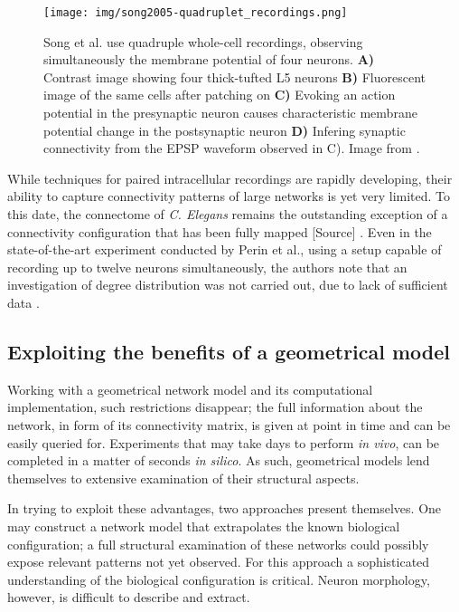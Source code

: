 \vspace{0.35cm}
\begin{figure}[bth]
  \centering
  \texttt{[image: img/song2005-quadruplet\_recordings.png]}
  \caption{Song et al. use quadruple whole-cell recordings, observing
    simultaneously the membrane potential of four neurons.
    \textbf{A)} Contrast image showing four thick-tufted L5 neurons
    \textbf{B)} Fluorescent image of the same cells after patching on
    \textbf{C)} Evoking an action potential in the presynaptic neuron
    causes characteristic membrane potential change in the
    postsynaptic neuron \textbf{D)} Infering synaptic connectivity
    from the EPSP waveform observed in C). Image from \parencite{Song2005}.
  }
\end{figure}
\vspace{0.45cm}

While techniques for paired intracellular recordings are rapidly
developing, their ability to capture connectivity patterns of large
networks is yet very limited. To this date, the connectome of
\textit{C. Elegans} remains the outstanding exception of a
connectivity configuration that has been fully mapped
[\textcolor{linkgrey}{Source}]%
. Even in the state-of-the-art experiment conducted by Perin et al.,
using a setup capable of recording up to twelve neurons
simultaneously, the authors note that an investigation of degree
distribution was not carried out, due to lack of sufficient data
\parencite{Perin2011}.

\subsection*{Exploiting the benefits of a geometrical model}

Working with a geometrical network model and its computational
implementation, such restrictions disappear; the full information
about the network, in form of its connectivity matrix, is given at
point in time and can be easily queried for. Experiments that may take
days to perform \textit{in vivo}, can be completed in a matter of seconds \textit{in
silico}. As such, geometrical models lend themselves to extensive
examination of their structural aspects.

In trying to exploit these advantages, two approaches present
themselves. One may construct a network model that
extrapolates the known
biological configuration; a full structural examination of these
networks could possibly expose relevant patterns not yet observed. For
this approach a sophisticated understanding of the biological
configuration is critical. Neuron morphology, however, is difficult to
describe and extract.

